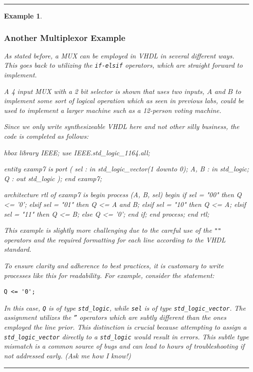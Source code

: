 \documentclass[12pt]{article}
\newtheorem{example}{Example}
\newenvironment{examp}
{
	\vspace{.5cm}
	\hrule
\begin{example}\upshape}
	{\hrule
		\vspace{0.5cm}
\end{example}}
\begin{document}
\begin{examp}
	\subsubsection*{Another Multiplexor Example}
	As stated before, a MUX can be employed in VHDL in several different ways.
	This goes back to utilizing the \texttt{if-elsif} operators, which are
	straight forward to implement.

	A 4 input MUX with a 2 bit selector is shown
	that uses two inputs, $A$ and $B$ to implement some sort of logical operation
	which as seen in previous labs, could be used to implement a larger machine
	such as a 12-person voting machine.

	Since we only write synthesizeable VHDL here and not other silly business, the
	code is completed as follows:
	\begin{TermUnix}{hbox}
		library IEEE;
		use IEEE.std_logic_1164.all;

		entity examp7 is
		port (
		sel : in std_logic_vector(1 downto 0);
		A, B : in std_logic;
		Q : out std_logic
		);
		end examp7;

		architecture rtl of examp7 is
		begin
		process (A, B, sel)
		begin
		if sel = "00" then
		Q <= '0';
		elsif sel = "01" then
		Q <= A and B;
		elsif sel = "10" then
		Q <= A;
		elsif sel = "11" then
		Q <= B;
		else
		Q <= '0';
		end if;
		end process;
		end rtl;
	\end{TermUnix}
	This example is slightly more challenging due to the careful use of the
	\texttt{""} operators and the required formatting for each line according to
	the VHDL standard.

	To ensure clarity and adherence to best practices, it is customary to write
	processes like this for readability. For example, consider the statement:
	\begin{verbatim}
Q <= '0';
        \end{verbatim}
	In this case, \texttt{Q} is of type \texttt{std\_logic}, while \texttt{sel} is
	of type \texttt{std\_logic\_vector}. The assignment utilizes the \texttt{''}
	operators which are subtly different than the ones employed the line prior.
	This distinction is crucial because
	attempting to assign a \texttt{std\_logic\_vector} directly to a
	\texttt{std\_logic} would result in errors. This subtle type
	mismatch is a common source of bugs and can lead to hours of troubleshooting if
	not addressed early. (Ask me how I know!)


\end{examp}
\end{document}
